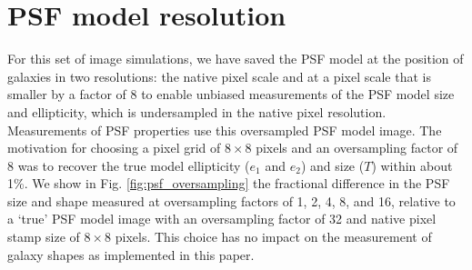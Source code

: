 \documentclass[aps,prd, amsmath,amssymb,superscriptaddress,showkeys,nofootinbib,reprint,preprintnumbers]{revtex4-1}
\begin{document}
\begin{table}
\end{table}

\section{PSF model resolution}
\label{app:psf_resol}

For this set of image simulations, we have saved the PSF model at the position of galaxies in two resolutions: the native pixel scale and at a pixel scale that is smaller by a factor of 8 to enable unbiased measurements of the PSF model size and ellipticity, which is undersampled in the native pixel resolution. Measurements of PSF properties use this oversampled PSF model image. The motivation for choosing a pixel grid of $8\times8$ pixels and an oversampling factor of 8 was to recover the true model ellipticity ($e_1$ and $e_2$) and size ($T$) within about 1\%. We show in Fig. \ref{fig:psf_oversampling} the fractional difference in the PSF size and shape measured at oversampling factors of 1, 2, 4, 8, and 16, relative to a `true' PSF model image with an oversampling factor of 32 and native pixel stamp size of $8\times 8$ pixels. This choice has no impact on the measurement of galaxy shapes as implemented in this paper.
 
\end{document}
